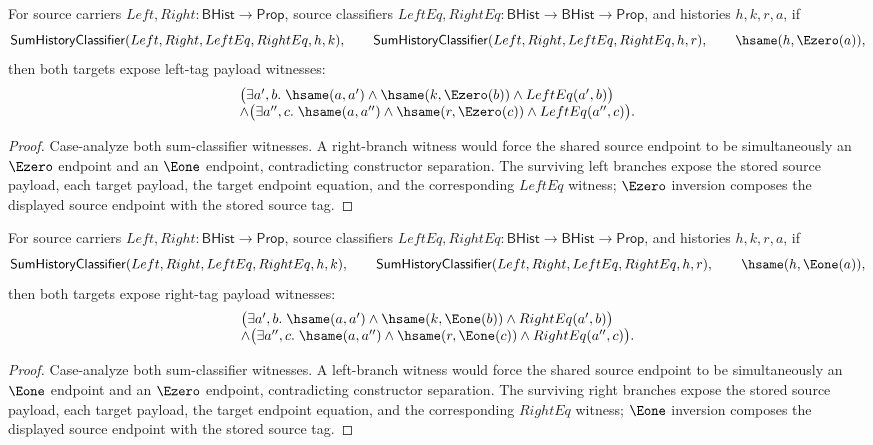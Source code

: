 \begin{theorem}
\label{thm:sum-history-classifier-left-endpoint-fanout}
For source carriers $Left,Right:\mathsf{BHist}\to\mathsf{Prop}$, source
classifiers $LeftEq,RightEq:\mathsf{BHist}\to\mathsf{BHist}\to\mathsf{Prop}$,
and histories $h,k,r,a$, if
$$
\mathsf{SumHistoryClassifier}(Left,Right,LeftEq,RightEq,h,k),\qquad
\mathsf{SumHistoryClassifier}(Left,Right,LeftEq,RightEq,h,r),\qquad
\hsame(h,\Ezero(a)),
$$
then both targets expose left-tag payload witnesses:
$$
\begin{array}{l}
\bigl(\exists a',b.\;\hsame(a,a')\land\hsame(k,\Ezero(b))\land LeftEq(a',b)\bigr)
\\
\land
\bigl(\exists a'',c.\;\hsame(a,a'')\land\hsame(r,\Ezero(c))\land LeftEq(a'',c)\bigr).
\end{array}
$$
\end{theorem}
\begin{proof}
Case-analyze both sum-classifier witnesses. A right-branch witness would force
the shared source endpoint to be simultaneously an $\Ezero$ endpoint and an
$\Eone$ endpoint, contradicting constructor separation. The surviving left
branches expose the stored source payload, each target payload, the target
endpoint equation, and the corresponding $LeftEq$ witness; $\Ezero$ inversion
composes the displayed source endpoint with the stored source tag.
\end{proof}

\begin{theorem}
\label{thm:sum-history-classifier-right-endpoint-fanout}
For source carriers $Left,Right:\mathsf{BHist}\to\mathsf{Prop}$, source
classifiers $LeftEq,RightEq:\mathsf{BHist}\to\mathsf{BHist}\to\mathsf{Prop}$,
and histories $h,k,r,a$, if
$$
\mathsf{SumHistoryClassifier}(Left,Right,LeftEq,RightEq,h,k),\qquad
\mathsf{SumHistoryClassifier}(Left,Right,LeftEq,RightEq,h,r),\qquad
\hsame(h,\Eone(a)),
$$
then both targets expose right-tag payload witnesses:
$$
\begin{array}{l}
\bigl(\exists a',b.\;\hsame(a,a')\land\hsame(k,\Eone(b))\land RightEq(a',b)\bigr)
\\
\land
\bigl(\exists a'',c.\;\hsame(a,a'')\land\hsame(r,\Eone(c))\land RightEq(a'',c)\bigr).
\end{array}
$$
\end{theorem}
\begin{proof}
Case-analyze both sum-classifier witnesses. A left-branch witness would force
the shared source endpoint to be simultaneously an $\Eone$ endpoint and an
$\Ezero$ endpoint, contradicting constructor separation. The surviving right
branches expose the stored source payload, each target payload, the target
endpoint equation, and the corresponding $RightEq$ witness; $\Eone$ inversion
composes the displayed source endpoint with the stored source tag.
\end{proof}


